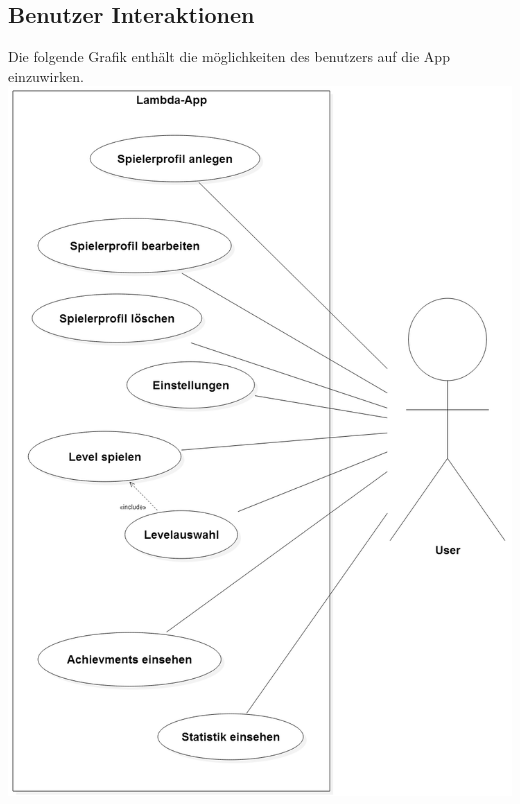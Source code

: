 \documentclass{scrartcl}
\begin{document}
\begin{minipage}{1\textwidth}
\subsection{Benutzer Interaktionen}
Die folgende Grafik enthält die möglichkeiten des benutzers auf die App einzuwirken.\\
\includegraphics[width=\textwidth]{assets/Benutzerdiagramm}
\end{minipage}

\clearpage





{}
\printglossary[title=Glossar]
\thispagestyle{empty}
    
\end{document}
